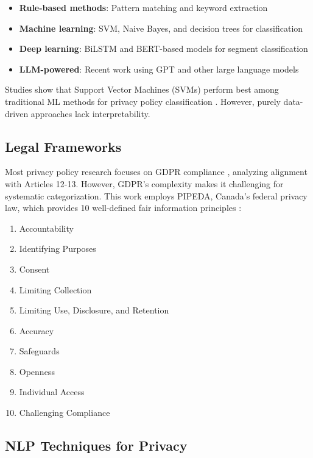 \documentclass[conference]{IEEEtran}
\begin{document}
\begin{itemize}
    \item \textbf{Rule-based methods}: Pattern matching and keyword extraction \cite{miniapps}
    \item \textbf{Machine learning}: SVM, Naive Bayes, and decision trees for classification \cite{systematic-review}
    \item \textbf{Deep learning}: BiLSTM and BERT-based models for segment classification
    \item \textbf{LLM-powered}: Recent work using GPT and other large language models \cite{llm-assessment, clear}
\end{itemize}

Studies show that Support Vector Machines (SVMs) perform best among traditional ML methods for privacy policy classification \cite{systematic-review}. However, purely data-driven approaches lack interpretability.

\subsection{Legal Frameworks}

Most privacy policy research focuses on GDPR compliance \cite{gdpr-ai, android-gdpr}, analyzing alignment with Articles 12-13. However, GDPR's complexity makes it challenging for systematic categorization. This work employs PIPEDA, Canada's federal privacy law, which provides 10 well-defined fair information principles \cite{pipeda-framework}:

\begin{enumerate}
    \item Accountability
    \item Identifying Purposes
    \item Consent
    \item Limiting Collection
    \item Limiting Use, Disclosure, and Retention
    \item Accuracy
    \item Safeguards
    \item Openness
    \item Individual Access
    \item Challenging Compliance
\end{enumerate}

\subsection{NLP Techniques for Privacy}
\end{document}
